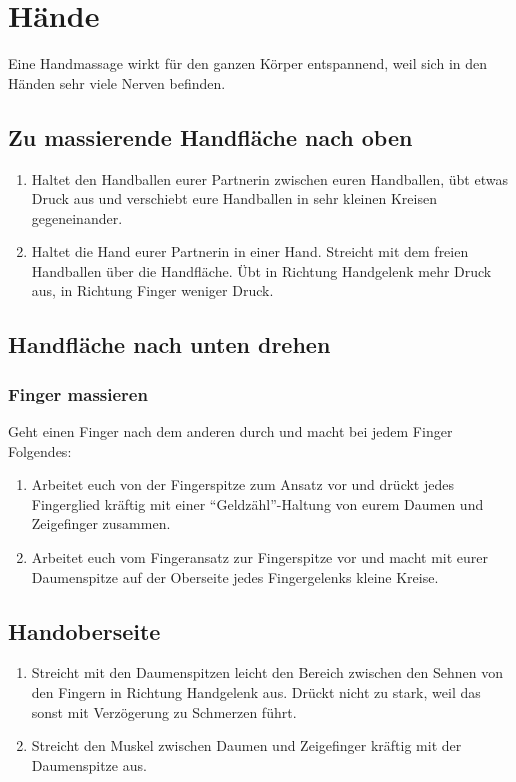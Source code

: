 \section{Hände}

Eine Handmassage wirkt für den ganzen Körper entspannend, weil sich in den Händen sehr viele Nerven befinden.

\subsection{Zu massierende Handfläche nach oben}
\begin{enumerate}
	\item {} Haltet den Handballen eurer Partnerin zwischen euren Handballen, übt etwas Druck aus und verschiebt eure Handballen in sehr kleinen Kreisen gegeneinander.
	\item {} Haltet die Hand eurer Partnerin in einer Hand. Streicht mit dem freien Handballen über die Handfläche. Übt in Richtung Handgelenk mehr Druck aus, in Richtung Finger weniger Druck.
\end{enumerate}


\subsection{Handfläche nach unten drehen}

\subsubsection{Finger massieren}

Geht einen Finger nach dem anderen durch und macht bei jedem Finger Folgendes:

\begin{enumerate}
	\item {} Arbeitet euch von der Fingerspitze zum Ansatz vor und drückt jedes Fingerglied kräftig mit einer "`Geldzähl"'-Haltung von eurem Daumen und Zeigefinger zusammen.
	\item {} Arbeitet euch vom Fingeransatz zur Fingerspitze vor und macht mit eurer Daumenspitze auf der Oberseite jedes Fingergelenks kleine Kreise.
\end{enumerate}

\subsection{Handoberseite}
\begin{enumerate}
	\item {} Streicht mit den Daumenspitzen leicht den Bereich zwischen den Sehnen von den Fingern in Richtung Handgelenk aus. Drückt nicht zu stark, weil das sonst mit Verzögerung zu Schmerzen führt.
	\item {} Streicht den Muskel zwischen Daumen und Zeigefinger kräftig mit der Daumenspitze aus.
\end{enumerate}

